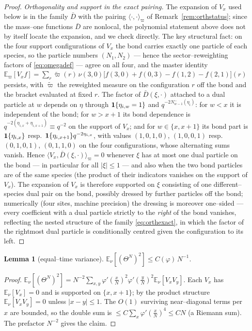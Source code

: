 \documentclass[11pt]{article}
\theoremstyle{plain}
\newtheorem{lemma}[theorem]{Lemma}
\theoremstyle{definition}
\theoremstyle{remark}
\newcommand{\E}{\mathbb{E}}\newcommand{\PP}{\mathbb{P}}\newcommand{\dd}{\,\mathrm{d}}
\begin{document}
\begin{proof}
\emph{Orthogonality and support in the exact pairing.} The expansion of $V_x$ used
below is in the family $\bar D$ with the pairing
$\langle\cdot,\cdot\rangle_\varpi$ of Remark~\ref{rem:orthstatus}; since the
mass--one functions $\bar D$ are nonlocal, the polynomial statement above does not by
itself locate the expansion, and we check directly. The key structural fact: on the
four support configurations of $V_x$ the bond carries exactly one particle of each
species, so the particle numbers $(N_1,N_2)$ --- hence the sector--reweighting
factors of \eqref{eq:omegadef} --- agree on all four, and the master identity
$\E_\varpi[V_xf]=\sum_r\widetilde\varpi(r)\,\nu(3,0)\big[f(3,0)+f(0,3)-f(1,2)-f(2,1)\big](r)$
persists, with $\widetilde\varpi$ the reweighted measure on the configuration $r$
off the bond and the bracket evaluated at fixed $r$. The factor of
$\bar D(\xi,\cdot)$ attached to a dual particle at $w$ depends on $\eta$ through
$\mathbf 1\{\eta_{i,w}=1\}$ and $q^{-2N^-_{w-1}(\eta_i)}$: for $w<x$ it is independent of
the bond; for $w>x+1$ its bond dependence is
$q^{-2(\eta_{i,x}+\eta_{i,x+1})}\equiv q^{-2}$ on the support of $V_x$; and for
$w\in\{x,x+1\}$ its bond part is $\mathbf 1\{\eta_{i,x}\}$ resp.\
$\mathbf 1\{\eta_{i,x+1}\}q^{-2\eta_{i,x}}$, with values $(1,0,1,0)$, $(1,0,0,1)$ resp.\
$(0,1,0,1)$, $(0,1,1,0)$ on the four configurations, whose alternating sums vanish.
Hence $\langle V_x,\bar D(\xi,\cdot)\rangle_\varpi=0$ whenever $\xi$ has at most one
dual particle on the bond --- in particular for all $|\xi|\le1$ --- and also when
the two bond particles are of the same species (the product of their indicators
vanishes on the support of $V_x$). The expansion of $V_x$ is therefore supported on
$\xi$ consisting of one different--species dual pair on the bond, possibly dressed
by further particles off the bond; numerically (four sites, machine precision) the
dressing is moreover one--sided --- every coefficient with a dual particle strictly
to the \emph{right} of the bond vanishes, reflecting the nested structure of the
family \eqref{eq:orthexact}, in which the factor of the rightmost dual particle is
conditionally centred given the configuration to its left.
\end{proof}

\begin{lemma}[equal--time variance]\label{lem:eqvar}
$\E_\nu[(\Theta^N)^2]\le C(\varphi)\,N^{-1}$.
\end{lemma}
\begin{proof}
$\E_\nu[(\Theta^N)^2]=N^{-2}\sum_{x,y}\varphi'(\tfrac xN)^2\varphi'(\tfrac yN)^2\E_\nu[V_xV_y]$.
Each $V_x$ has $\E_\nu[V_x]=0$ and is supported on $\{x,x+1\}$; by the product structure
$\E_\nu[V_xV_y]=0$ unless $|x-y|\le1$. The $O(1)$ surviving near--diagonal terms per $x$
are bounded, so the double sum is $\le C\sum_x\varphi'(\tfrac xN)^4\le CN$ (a Riemann
sum). The prefactor $N^{-2}$ gives the claim.
\end{proof}
\end{document}
